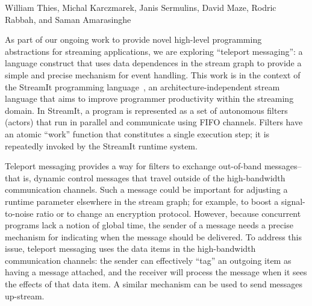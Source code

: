 \documentclass{csailabstractbook}
\begin{document}


         {William Thies, Michal Karczmarek, Janis Sermulins, David Maze, Rodric Rabbah, and Saman Amarasinghe}



As part of our ongoing work to provide novel high-level programming
abstractions for streaming applications, we are exploring ``teleport
messaging'': a language construct that uses data dependences in the
stream graph to provide a simple and precise mechanism for event
handling.  This work is in the context of the StreamIt programming
language~\cite{streamitcc}, an architecture-independent stream
language that aims to improve programmer productivity within the
streaming domain.  In StreamIt, a program is represented as a set of
autonomous filters (actors) that run in parallel and communicate using
FIFO channels.  Filters have an atomic ``work'' function that
constitutes a single execution step; it is repeatedly invoked by the
StreamIt runtime system.

Teleport messaging provides a way for filters to exchange out-of-band
messages--that is, dynamic control messages that travel outside of the
high-bandwidth communication channels.  Such a message could be
important for adjusting a runtime parameter elsewhere in the stream
graph; for example, to boost a signal-to-noise ratio or to change an
encryption protocol.  However, because concurrent programs lack a
notion of global time, the sender of a message needs a precise
mechanism for indicating when the message should be delivered.  To
address this issue, teleport messaging uses the data items in the
high-bandwidth communication channels: the sender can effectively
``tag'' an outgoing item as having a message attached, and the
receiver will process the message when it sees the effects of that
data item.  A similar mechanism can be used to send messages
up-stream.

\end{document}
